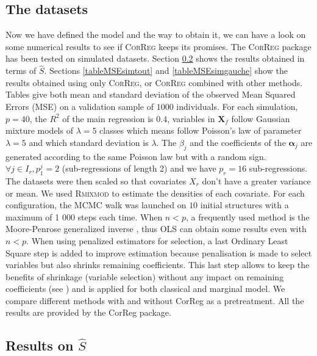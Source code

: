 \documentclass[12pt,a4paper]{report}
\begin{document}
	\subsection{The datasets}	
	Now we have defined the model and the way to obtain it, we can have a look on some numerical results to see if \textsc{CorReg} 	keeps its promises.
	The \textsc{CorReg} package has been tested on simulated datasets. 
Section \ref{compZ} shows the results obtained in terms of $\hat{S}$. Sections \ref{tableMSEsimtout} and \ref{tableMSEsimgauche} show the results obtained using only \textsc{CorReg}, or \textsc{CorReg} combined with other methods. Tables give both mean and standard deviation of the observed Mean Squared Errors (MSE) on a validation sample of $1 000$ individuals. For each simulation,  $p=40$, the $R^2$ of the main regression is $0.4$, variables in $\boldsymbol{X}_f$ follow Gaussian mixture models of $\lambda=5$ classes which means follow Poisson's law of parameter $\lambda=5$ and which standard deviation is $\lambda$. The $\beta_j$ and the coefficients of the $\boldsymbol{\alpha}_j$ are generated according to the same Poisson law but with a random sign. $\forall j \in I_r, p_1^j=2$ (sub-regressions of length 2) and we have $p_r=16$ sub-regressions. The datasets were then scaled so that covariates $X_r$ don't have a greater variance or mean.
	We used \textsc{Rmixmod} to estimate the densities of each covariate. For each configuration, the MCMC walk was launched on $10$ initial structures with a maximum of 1 000 steps each time.
	When $n<p$, a frequently used method is the Moore-Penrose generalized inverse \cite{katsikis2008fast}, thus OLS can obtain some results even with $n<p$. %
	When using penalized estimators for selection, a last Ordinary Least Square step is added to improve estimation because penalisation is made to select variables but also shrinks remaining coefficients. This last step allows to keep the benefits of shrinkage (variable selection) without any impact on remaining coefficients (see \cite{SAM10088}) and is applied for both classical and marginal model.
	We compare different methods with and without CorReg as a pretreatment. All the results are provided by the CorReg package.
	
		\subsection{Results on $\hat S$}	\label{compZ}
\end{document}
